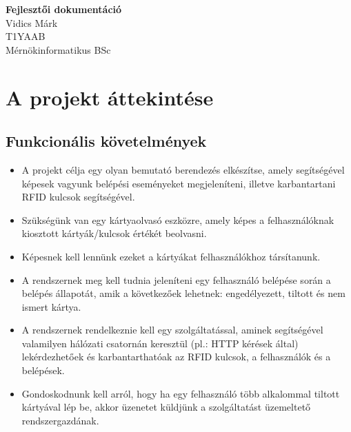 \documentclass[11pt, a4paper]{article}
\begin{document}
	
	\begin{titlepage}
		\vspace*{\fill}
		\begin{center}
			\Huge \textbf{Fejlesztői dokumentáció} \\
			Vidics Márk \\
			T1YAAB \\
			Mérnökinformatikus BSc
		\end{center}
		\vspace*{\fill}
	\end{titlepage}
	
	\tableofcontents
	\listoftables
	
	\section{A projekt áttekintése}
		\subsection{Funkcionális követelmények}
			\begin{itemize}
			\justifying
				\item A projekt célja egy olyan bemutató berendezés elkészítse, amely segítségével képesek vagyunk belépési eseményeket megjeleníteni, illetve karbantartani RFID kulcsok segítségével.
				
				\item Szükségünk van egy kártyaolvasó eszközre, amely képes a felhasználóknak kiosztott kártyák/kulcsok értékét beolvasni.
				
				\item Képesnek kell lennünk ezeket a kártyákat felhasználókhoz társítanunk.
				
				\item A rendszernek meg kell tudnia jeleníteni egy felhasználó belépése során a belépés állapotát, amik a következőek lehetnek: engedélyezett, tiltott és nem ismert kártya.
				
				\item A rendszernek rendelkeznie kell egy szolgáltatással, aminek segítségével valamilyen hálózati csatornán keresztül (pl.: HTTP kérések által) lekérdezhetőek és karbantarthatóak az RFID kulcsok, a felhasználók és a belépések.
				
				\item Gondoskodnunk kell arról, hogy ha egy felhasználó több alkalommal tiltott kártyával lép be, akkor üzenetet küldjünk a szolgáltatást üzemeltető rendszergazdának.
			\end{itemize}
		\vfill
\end{document}
